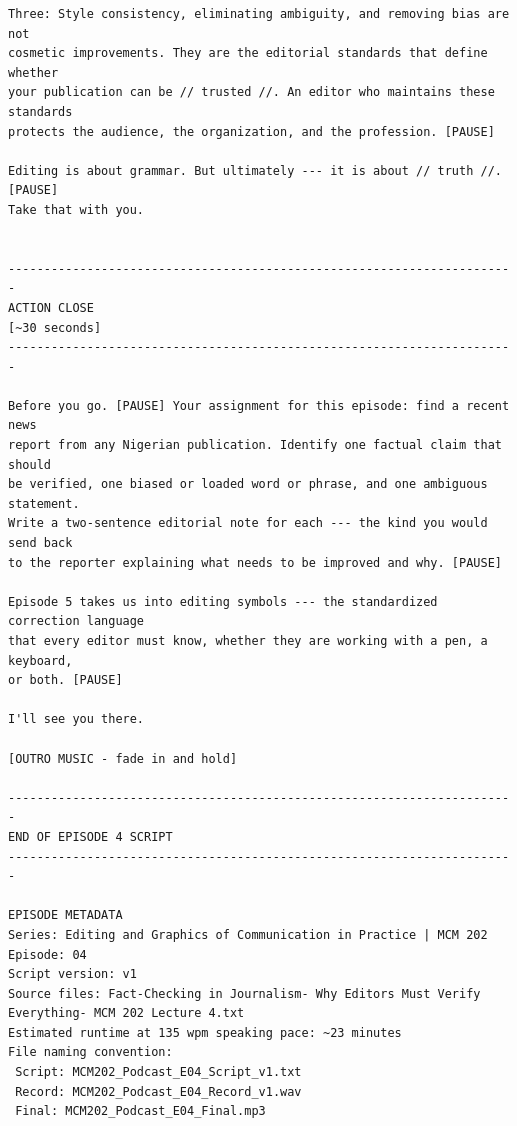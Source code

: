{\begin{Verbatim}
Three: Style consistency, eliminating ambiguity, and removing bias are not
cosmetic improvements. They are the editorial standards that define whether
your publication can be // trusted //. An editor who maintains these standards
protects the audience, the organization, and the profession. [PAUSE]

Editing is about grammar. But ultimately --- it is about // truth //. [PAUSE]
Take that with you.


-----------------------------------------------------------------------
ACTION CLOSE
[~30 seconds]
-----------------------------------------------------------------------

Before you go. [PAUSE] Your assignment for this episode: find a recent news
report from any Nigerian publication. Identify one factual claim that should
be verified, one biased or loaded word or phrase, and one ambiguous statement.
Write a two-sentence editorial note for each --- the kind you would send back
to the reporter explaining what needs to be improved and why. [PAUSE]

Episode 5 takes us into editing symbols --- the standardized correction language
that every editor must know, whether they are working with a pen, a keyboard,
or both. [PAUSE]

I'll see you there.

[OUTRO MUSIC - fade in and hold]

-----------------------------------------------------------------------
END OF EPISODE 4 SCRIPT
-----------------------------------------------------------------------

EPISODE METADATA
Series: Editing and Graphics of Communication in Practice | MCM 202
Episode: 04
Script version: v1
Source files: Fact-Checking in Journalism- Why Editors Must Verify Everything- MCM 202 Lecture 4.txt
Estimated runtime at 135 wpm speaking pace: ~23 minutes
File naming convention:
 Script: MCM202_Podcast_E04_Script_v1.txt
 Record: MCM202_Podcast_E04_Record_v1.wav
 Final: MCM202_Podcast_E04_Final.mp3
\end{Verbatim}
}
